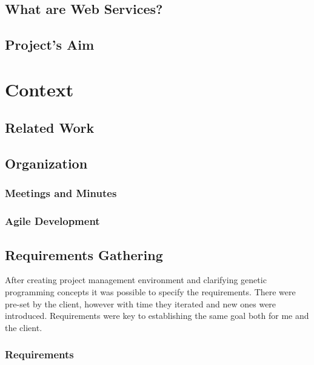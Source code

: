 \documentclass{l4proj}
\begin{document}
\section{What are Web Services?}


\section{Project's Aim}


\chapter{Context}

\section{Related Work}



\section{Organization}


\subsection{Meetings and Minutes}


\subsection{Agile Development}



\section{Requirements Gathering}
After creating project management environment and clarifying genetic programming concepts it was possible to specify the requirements.
There were pre-set by the client, however with time they iterated and new ones were introduced. Requirements were key to establishing
the same goal both for me and the client.
\subsection{Requirements}

\end{document}
